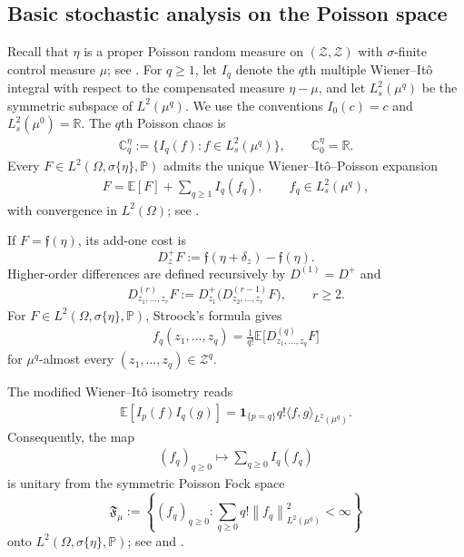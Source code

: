 \documentclass[ECP,preprint]{ejpecp}
\newcommand{\E}{\mathbb{E}}
\newcommand{\PP}{\mathbb{P}}
\newcommand{\R}{\mathbb{R}}
\newcommand{\ind}{\mathbf{1}}
\newcommand{\cZ}{\mathcal{Z}}
\newcommand{\sZ}{\mathscr{Z}}
\newcommand{\bC}{\mathbb{C}^\eta}
\newcommand{\norm}[1]{\left\lVert #1\right\rVert}
\newcommand{\dl}{\delta}
\newcommand{\s}{\sigma}
\begin{document}
\subsection{Basic stochastic analysis on the Poisson space}
\label{SEC_21}

Recall that $\eta$ is a proper Poisson random measure on
$(\cZ,\sZ)$ with $\s$-finite control measure $\mu$; see
\cite[Corollary~3.7]{LP18}.  For $q\geq1$, let $I_q$ denote
the $q$th multiple Wiener--It\^o integral with respect to the
compensated measure $\eta-\mu$, and let $L_s^2(\mu^q)$ be the
symmetric subspace of $L^2(\mu^q)$.  We use the conventions
$I_0(c)=c$ and $L_s^2(\mu^0)=\R$.  The $q$th Poisson chaos is
\begin{align}
\bC_q
:=
\{I_q(f):f\in L_s^2(\mu^q)\},
\qquad
\bC_0=\R.
\label{def_CP}
\end{align}
Every $F\in L^2(\Omega,\s\{\eta\},\PP)$ admits the unique
Wiener--It\^o--Poisson expansion
\begin{align}
F
=
\E[F]
+
\sum_{q\geq1}I_q(f_q),
\qquad
f_q\in L_s^2(\mu^q),
\label{decomp}
\end{align}
with convergence in $L^2(\Omega)$; see
\cite[Theorem~18.10]{LP18}.

If $F=\mathfrak f(\eta)$, its add-one cost is
\[
D_z^+F
:=
\mathfrak f(\eta+\dl_z)-\mathfrak f(\eta).
\]
Higher-order differences are defined recursively by
$D^{(1)}=D^+$ and
\begin{align}
D^{(r)}_{z_1,\ldots,z_r}F
:=
D_{z_1}^+
\bigl(D^{(r-1)}_{z_2,\ldots,z_r}F\bigr),
\qquad r\geq2.
\label{def_MD}
\end{align}
For $F\in L^2(\Omega,\s\{\eta\},\PP)$, Stroock's formula gives
\begin{align}
f_q(z_1,\ldots,z_q)
=
\frac{1}{q!}
\E\bigl[D^{(q)}_{z_1,\ldots,z_q}F\bigr]
\label{for1}
\end{align}
for $\mu^q$-almost every
$(z_1,\ldots,z_q)\in\cZ^q$.

The modified Wiener--It\^o isometry reads
\begin{align}
\E[I_p(f)I_q(g)]
=
\ind_{\{p=q\}}q!
\langle f,g\rangle_{L^2(\mu^q)}.
\label{iso_mod}
\end{align}
Consequently, the map
\begin{align}
(f_q)_{q\geq0}
\longmapsto
\sum_{q\geq0}I_q(f_q)
\label{fock_iso}
\end{align}
is unitary from the symmetric Poisson Fock space
\[
\mathfrak F_\mu
:=
\left\{
(f_q)_{q\geq0}:
\sum_{q\geq0}q!\norm{f_q}_{L^2(\mu^q)}^2<\infty
\right\}
\]
onto $L^2(\Omega,\s\{\eta\},\PP)$; see
\cite[Chapter~18]{LP18} and \cite{LP11,Last16}.
\end{document}
